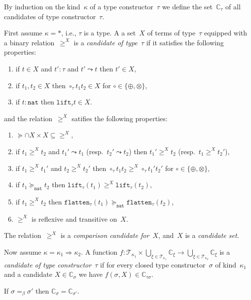 \documentclass[runningheads,a4paper]{llncs}
\newcommand{\arrkind}{\Rightarrow}
\newcommand{\Tc}{\mathcal{T}}
\newcommand{\nat}{\mathtt{nat}}
\newcommand{\flatten}{\mathtt{flatten}}
\newcommand{\lift}{\mathtt{lift}}
\newcommand{\Cb}{\mathbb{C}}
\begin{document}
\begin{definition}\label{def_wm_candidate}\normalfont
  By induction on the kind~$\kappa$ of a type constructor~$\tau$ we
  define the set~$\Cb_\tau$ of all candidates of type
  constructor~$\tau$.

  First assume $\kappa=*$, i.e., $\tau$ is a type. A a set~$X$ of
  terms of type~$\tau$ equipped with a binary relation~$\ge^X$ is a
  \emph{candidate of type~$\tau$} if it satisfies the following
  properties:
  \begin{enumerate}
  \item if $t \in X$ and $t' : \tau$ and $t' \leadsto t$ then $t' \in
    X$,
  \item if $t_1,t_2 \in X$ then $\circ_\tau t_1 t_2 \in X$ for $\circ
    \in \{\oplus,\otimes\}$,
  \item if $t : \nat$ then $\lift_\tau t \in X$.
  \end{enumerate}
  and the relation~$\ge^X$ satifies the following properties:
  \begin{enumerate}
  \item ${\succeq} \cap X \times X \subseteq {\ge^X}$,
  \item if $t_1 \ge^X t_2$ and $t_1' \leadsto t_1$ (resp.~$t_2'
    \leadsto t_2$) then $t_1' \ge^X t_2$ (resp.~$t_1 \ge^X t_2'$),
  \item if $t_1 \ge^X t_1'$ and $t_2 \ge^X t_2'$ then $\circ_\tau t_1
    t_2 \ge^X \circ_\tau t_1' t_2'$ for $\circ \in
    \{\oplus,\otimes\}$,
  \item if $t_1 \succeq_\nat t_2$ then $\lift_\tau(t_1) \ge^X
    \lift_\tau(t_2)$,
  \item if $t_1 \ge^X t_2$ then $\flatten_\tau(t_1) \succeq_\nat
    \flatten_\tau(t_2)$,
  \item $\ge^X$ is reflexive and transitive on~$X$.
  \end{enumerate}
  The relation~$\ge^X$ is a \emph{comparison candidate for~$X$},
  and~$X$ is a \emph{candidate set}.

  Now assume $\kappa = \kappa_1\arrkind\kappa_2$. A function $f :
  \Tc_{\kappa_1} \times \bigcup_{\xi\in\Tc_{\kappa_1}}\Cb_\xi \to
  \bigcup_{\xi\in\Tc_{\kappa_2}}\Cb_\xi$ is a \emph{candidate of type
    constructor~$\tau$} if for every closed type constructor~$\sigma$
  of kind~$\kappa_1$ and a candidate $X \in \Cb_\sigma$ we have
  $f(\sigma,X) \in \Cb_{\tau\sigma}$.
\end{definition}

\begin{lemma}\label{lem_beta_wm_candidate}
  If $\sigma =_\beta \sigma'$ then $\Cb_\sigma = \Cb_{\sigma'}$.
\end{lemma}
\end{document}
